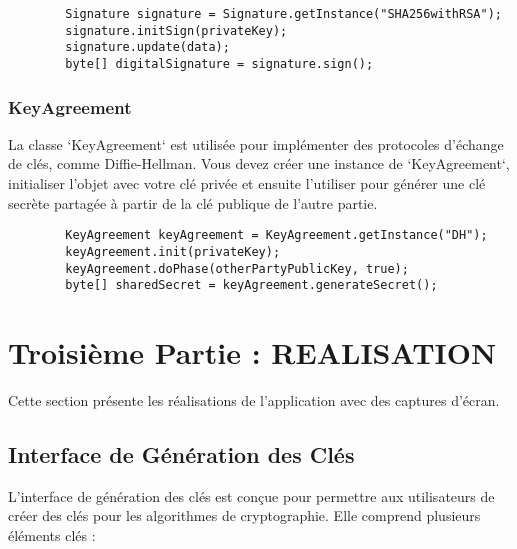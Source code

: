 \documentclass[a4paper,12pt]{report}
\begin{document}
	\begin{verbatim}
		Signature signature = Signature.getInstance("SHA256withRSA");
		signature.initSign(privateKey);
		signature.update(data);
		byte[] digitalSignature = signature.sign();
	\end{verbatim}
	
	\subsection{KeyAgreement}
	La classe `KeyAgreement` est utilisée pour implémenter des protocoles d'échange de clés, comme Diffie-Hellman. Vous devez créer une instance de `KeyAgreement`, initialiser l'objet avec votre clé privée et ensuite l'utiliser pour générer une clé secrète partagée à partir de la clé publique de l'autre partie.
	
	\begin{verbatim}
		KeyAgreement keyAgreement = KeyAgreement.getInstance("DH");
		keyAgreement.init(privateKey);
		keyAgreement.doPhase(otherPartyPublicKey, true);
		byte[] sharedSecret = keyAgreement.generateSecret();
	\end{verbatim}
	
	\chapter{Troisième Partie : REALISATION}
	Cette section présente les réalisations de l'application avec des captures d'écran.
	
\section{Interface de Génération des Clés}

L'interface de génération des clés est conçue pour permettre aux utilisateurs de créer des clés pour les algorithmes de cryptographie. Elle comprend plusieurs éléments clés :
\end{document}

